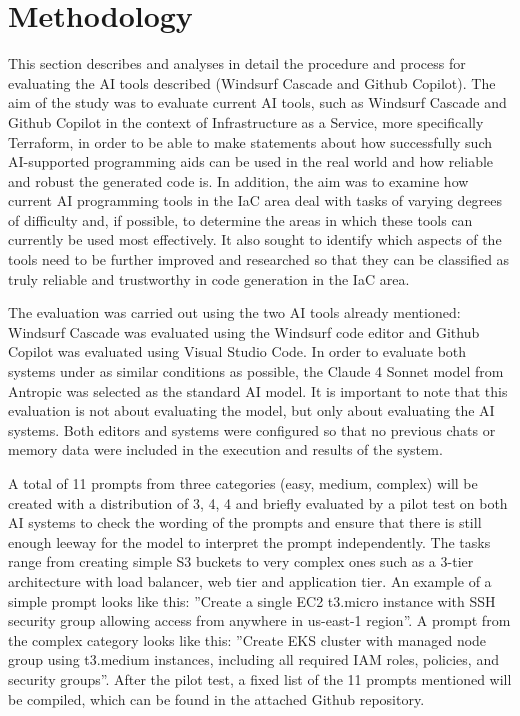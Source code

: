\section{Methodology}
\label{sec:methodology}

This section describes and analyses in detail the procedure and process for evaluating the AI tools described (Windsurf Cascade and Github Copilot). The aim of the study was to evaluate current AI tools, such as Windsurf Cascade and Github Copilot in the context of Infrastructure as a Service, more specifically Terraform, in order to be able to make statements about how successfully such AI-supported programming aids can be used in the real world and how reliable and robust the generated code is. In addition, the aim was to examine how current AI programming tools in the IaC area deal with tasks of varying degrees of difficulty and, if possible, to determine the areas in which these tools can currently be used most effectively. It also sought to identify which aspects of the tools need to be further improved and researched so that they can be classified as truly reliable and trustworthy in code generation in the IaC area.

The evaluation was carried out using the two AI tools already mentioned: Windsurf Cascade was evaluated using the Windsurf code editor and Github Copilot was evaluated using Visual Studio Code. In order to evaluate both systems under as similar conditions as possible, the Claude 4 Sonnet model from Antropic \cite{claude_sonnet_2025} was selected as the standard AI model. It is important to note that this evaluation is not about evaluating the model, but only about evaluating the AI systems. Both editors and systems were configured so that no previous chats or memory data were included in the execution and results of the system.

A total of 11 prompts from three categories (easy, medium, complex) will be created with a distribution of 3, 4, 4 and briefly evaluated by a pilot test on both AI systems to check the wording of the prompts and ensure that there is still enough leeway for the model to interpret the prompt independently. The tasks range from creating simple S3 buckets to very complex ones such as a 3-tier architecture with load balancer, web tier and application tier. An example of a simple prompt looks like this: ''Create a single EC2 t3.micro instance with SSH security group allowing access from anywhere in us-east-1 region''. A prompt from the complex category looks like this: ''Create EKS cluster with managed node group using t3.medium instances, including all required IAM roles, policies, and security groups''. After the pilot test, a fixed list of the 11 prompts mentioned will be compiled, which can be found in the attached Github repository. 

